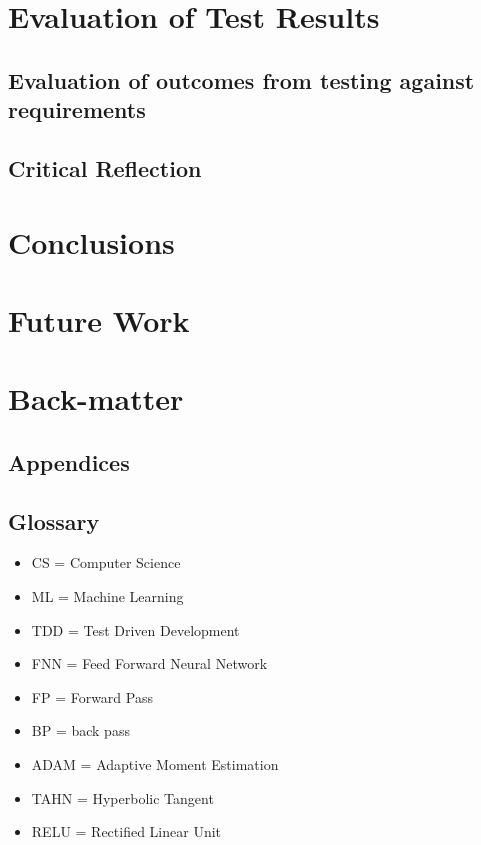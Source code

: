 \documentclass{article}
\begin{document}
\section{Evaluation of Test Results}
\subsection{Evaluation of outcomes from testing against requirements} %
\subsection{Critical Reflection}

\section{Conclusions}

\section{Future Work}

\section{Back-matter}
\subsection{Appendices}
\subsection{Glossary}
\begin{itemize}

\item CS = Computer Science
\item ML = Machine Learning
\item TDD = Test Driven Development
\item FNN = Feed Forward Neural Network
\item FP = Forward Pass
\item BP = back pass


\item ADAM = Adaptive Moment Estimation
\item TAHN = Hyperbolic Tangent
\item RELU = Rectified Linear Unit

\end{itemize}
\end{document}
